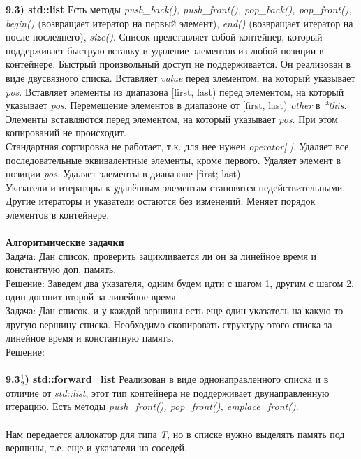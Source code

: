 \documentclass{article}
\begin{document}
\noindent \textbf{9.3) std::list}
Есть методы \textit{push\_back(), push\_front(), pop\_back(), pop\_front(), begin()} (возвращает итератор на первый элемент), \textit{end()} (возвращает итератор на после последнего), \textit{size()}.
Список представляет собой контейнер, который поддерживает быструю вставку и удаление элементов из любой позиции в контейнере. Быстрый произвольный доступ не поддерживается. Он реализован в виде двусвязного списка. 
Вставляет \textit{value} перед элементом, на который указывает \textit{pos}. 
Вставляет элементы из диапазона [first, last) перед элементом, на который указывает \textit{pos}.
Перемещение элементов в диапазоне от [first, last) \textit{other} в \textit{*this}. Элементы вставляются перед элементом, на который указывает \textit{pos}. При этом копирований не происходит.\\
Стандартная сортировка не работает, т.к. для нее нужен \textit{operator[ ]}.
Удаляет все последовательные эквивалентные элементы, кроме первого.
Удаляет элемент в позиции \textit{pos}.
Удаляет элементы в диапазоне [first; last).\\
Указатели и итераторы к удалённым элементам становятся недействительными. Другие итераторы и указатели остаются без изменений. 
Меняет порядок элементов в контейнере.\\\\
\noindent \textbf{Алгоритмические задачки}\\
Задача: Дан список, проверить зацикливается ли он за линейное время и константную доп. память.\\
Решение: Заведем два указателя, одним будем идти с шагом 1, другим с шагом 2, один догонит второй за линейное время.\\
Задача: Дан список, и у каждой вершины есть еще один указатель на какую-то другую вершину списка. Необходимо скопировать структуру этого списка за линейное время и константную память.\\
Решение: \\
\noindent \\ \textbf{9.3$\frac{1}{2}$) std::forward\_list}
Реализован в виде однонаправленного списка и в отличие от \textit{std::list}, этот тип контейнера не поддерживает двунаправленную итерацию. 
Есть методы \textit{push\_front(), pop\_front(), emplace\_front()}.\\\\
Нам передается аллокатор для типа \textit{T}, но в списке нужно выделять память под вершины, т.е. еще и указатели на соседей.
\end{document}
